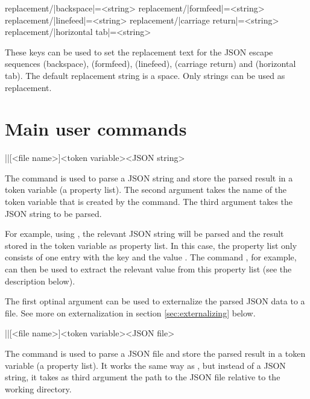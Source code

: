 \documentclass[a4paper]{article}
\begin{document}
{{\begin{codeexamplecolumns}

\end{codeexamplecolumns}

\begin{macrodef}
replacement/|backspace|={<string>}
replacement/|formfeed|={<string>}
replacement/|linefeed|={<string>}
replacement/|carriage return|={<string>}
replacement/|horizontal tab|={<string>}
\end{macrodef}
These keys can be used to set the replacement text for the JSON escape sequences \macro{\b} (backspace), \macro{\f} (formfeed), \macro{\n} (linefeed), \macro{\r} (carriage return) and \macro{\t} (horizontal tab). The default replacement string is a space. Only strings can be used as replacement.

\section{Main user commands}

\begin{macrodef}
|\JSONParse|[<file name>]{<token variable>}{<JSON string>}
\end{macrodef}
The command \macro{\JSONParse} is used to parse a JSON string and store the parsed result in a token variable (a property list). The second argument takes the name of the token variable that is created by the command. The third argument takes the JSON string to be parsed. 

For example, using , the relevant JSON string will be parsed and the result stored in the token variable \macro{\myJSONdata} as property list. In this case, the property list only consists of one entry with the key  and the value . The command , for example, can then be used to extract the relevant value from this property list (see the description below). 

The first optinal argument can be used to externalize the parsed JSON data to a file. See more on externalization in section \ref{sec:externalizing} below.

\begin{macrodef}
|\JSONParseFromFile|[<file name>]{<token variable>}{<JSON file>}
\end{macrodef}
The command \macro{\JSONParseFromFile} is used to parse a JSON file and store the parsed result in a token variable (a property list). It works the same way as \macro{\JSONParse}, but instead of a JSON string, it takes as third argument the path to the JSON file relative to the working directory.

}}
\end{document}
